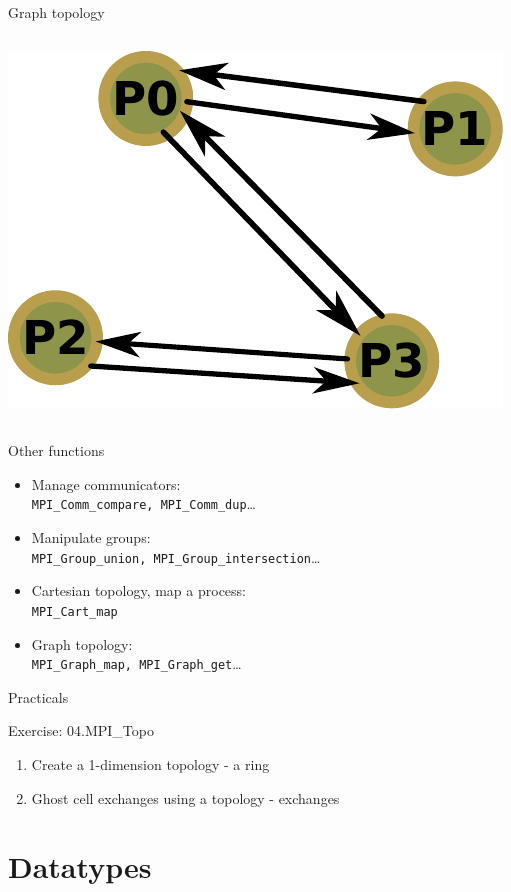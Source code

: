 \documentclass[aspectratio=43]{beamer}
\begin{document}
\begin{frame}[fragile]{Graph topology}
\begin{columns}
    \begin{column}{0.2\paperwidth}
\includegraphics[scale=0.36]{04.MPI_Topo/graph.pdf}
    \end{column}
\end{columns}

\end{frame}


\begin{frame}[fragile]{Other functions}
\begin{itemize}
    \item Manage communicators:\\\hspace{1cm}\verb+MPI_Comm_compare, MPI_Comm_dup+\ldots
    \item Manipulate groups:\\\hspace{1cm}\verb+MPI_Group_union, MPI_Group_intersection+\ldots
    \item Cartesian topology, map a process:\\\hspace{1cm}\verb+MPI_Cart_map+
    \item Graph topology:\\\hspace{1cm}\verb+MPI_Graph_map, MPI_Graph_get+\ldots
\end{itemize}
\end{frame}


\begin{frame}{Practicals}
    \begin{brown2block}{Exercise: 04.MPI\_Topo}
    \begin{enumerate}
        \item Create a 1-dimension topology - a ring
        \item Ghost cell exchanges using a topology - exchanges
    \end{enumerate}
    \end{brown2block}
\end{frame}



\section{Datatypes}

\end{document}
